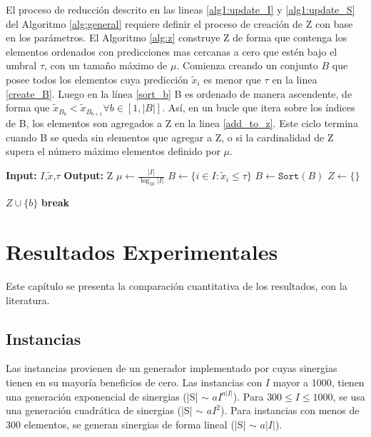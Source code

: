 \documentclass[spanish, a4paper, 12pt, openany,final]{book}
\begin{document}
 
 El proceso de reducción descrito en las lineas \ref{alg1:update_I} y \ref{alg1:update_S} del Algoritmo \ref{alg:general} requiere definir el proceso de creación de Z con base en los parámetros. El Algoritmo \ref{alg:z} construye Z de forma que contenga los elementos ordenados con predicciones mas cercanas a cero que estén bajo el umbral $\tau$, con un tamaño máximo de $\mu$. Comienza creando un conjunto $B$ que posee todos los elementos cuya predicción $\tilde{x}_i$ es menor que $\tau$ en la linea \ref{create_B}. Luego en la línea  \ref{sort_b} B es ordenado de manera ascendente, de forma que $\tilde{x}_{B_b} < \tilde{x}_{B_{b+1}}   \forall b \in [1,|B|]$. Así, en un bucle que itera sobre los índices de B, los elementos son agregados a Z en la linea \ref{add_to_z}. Este ciclo termina cuando B se queda sin elementos que agregar a Z, o si la cardinalidad de Z supera el número máximo elementos definido por $\mu$.
 
    \begin{algorithm}[H]
 	\caption{$Z(I,\tilde{x},\tau)$}\label{alg:z}
 	\begin{algorithmic}[1]
 		\Statex \textbf{Input:} $I$,$\tilde{x}$,$\tau$
 		\Statex \textbf{Output:} Z
 		\State $\mu \gets \frac{|I|}{\log_{10}{|I|}}$ \label{alg2:def_mu} 
 		\State $B \gets \{ i \in I: \tilde{x}_i \leq \tau \}$ \label{create_B}
 		\State $B \gets \mathtt{Sort}(B)$  \label{sort_b}
 		\State $Z \gets \{\}$	  
 		
 		\State $Z \cup \{b\} $ \label{add_to_z}
 		\label{if_c}
 		\State \textbf{break} \label{break}
 		\EndIf
 		\EndFor
 	\end{algorithmic}
 \end{algorithm}
 
 
 
 
\clearpage
\chapter{Resultados Experimentales}
Este capítulo se presenta la comparación cuantitativa de los resultados, con la literatura.

\section{Instancias}

Las instancias provienen de un generador implementado por \cite{baldo_polynomial_2023} cuyas sinergias tienen en su mayoría beneficios de cero. Las instancias con $I$ mayor a 1000, tienen una generación exponencial de sinergias (|S| $\sim$ $aI^{a|I|}$). Para $300 \le I \le 1000$, se usa una generación cuadrática de sinergias (|S| $\sim$ $aI^{2}$). Para instancias con menos de 300 elementos, se generan sinergias de forma lineal (|S| $\sim$ $a|I|$).
\end{document}
